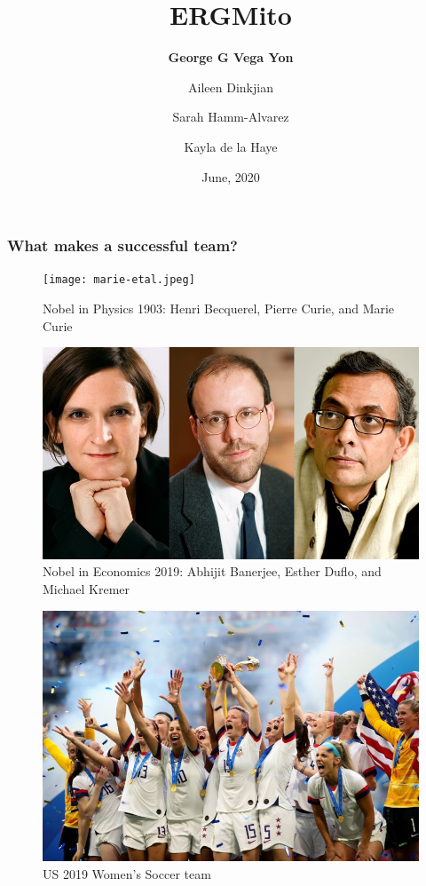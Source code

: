 \documentclass[aspectratio=169, 9pt]{beamer}\usepackage[]{graphicx}\usepackage[]{color}
\title[ERGMito at SciTS 2020]{ERGMito
\linebreak{\small Statistical Models for Small Team Social Networks}}
\author[USC-CTSI]{
\textbf{George G Vega Yon} \and
Aileen Dinkjian \and
Sarah Hamm-Alvarez \and
Kayla de la Haye
}
\institute[USC Keck School of Medicine]{University of Southern California\\Keck School of Medicine}
\date{June, 2020}
\begin{document}

\begin{frame}%
\maketitle
\end{frame}


\begin{frame}
\frametitle{What makes a successful team?}

\small

  \begin{minipage}[c]{.30\linewidth}
  \begin{figure}
  \texttt{[image: marie-etal.jpeg]}
  \caption{Nobel in Physics 1903: Henri Becquerel, Pierre Curie, and Marie Curie}
  \end{figure}
  \end{minipage}
  \hfill
  \begin{minipage}[c]{.30\linewidth}
  \begin{figure}
  \includegraphics[width=.99\linewidth]{duflo.jpg}
  \caption{Nobel in Economics 2019: Abhijit Banerjee, Esther Duflo, and Michael Kremer}
  \end{figure}
  \end{minipage}
  \hfill
  \begin{minipage}[c]{.30\linewidth}
  \begin{figure}
  \includegraphics[width=.99\linewidth]{usa-women-team.jpg}
  \caption{US 2019 Women's Soccer team}
  \end{figure}
  \end{minipage}


\end{frame}
\end{document}
